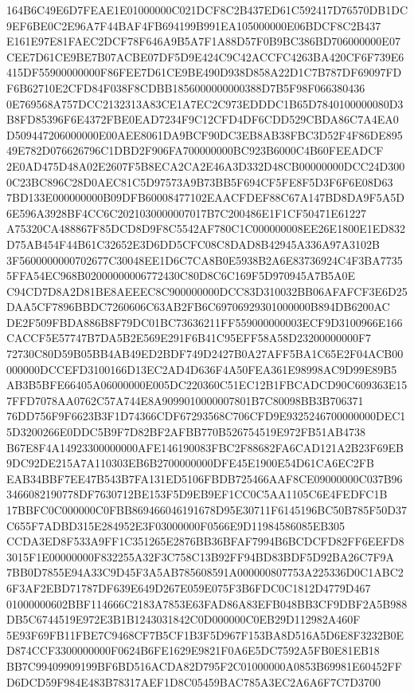 \documentclass[UTF8,fontset=fandol,zihao=-4,a4paper]{ctexart}
\begin{document}
{{164B6C49E6D7FEAE1E01000000C021DCF8C2B437ED61C592417D76570DB1DC9EF6BE0C2E96A7F44BAF4FB694199B991EA105000000E06BDCF8C2B437
E161E97E81FAEC2DCF78F646A9B5A7F1A88D57F0B9BC386BD706000000E07CEE7D61CE9BE7B07ACBE07DF5D9E424C9C42ACCFC4263BA420CF6F739E6
415DF55900000000F86FEE7D61CE9BE490D938D858A22D1C7B787DF69097FDF6B62710E2CFD84F038F8CDBB1856000000000388D7B5F98F066380436
0E769568A757DCC2132313A83CE1A7EC2C973EDDDC1B65D7840100000080D3B8FD85396F6E4372FBE0EAD7234F9C12CFD4DF6CDD529CBDA86C7A4EA0
D509447206000000E00AEE8061DA9BCF90DC3EB8AB38FBC3D52F4F86DE89549E782D076626796C1DBD2F906FA700000000BC923B6000C4B60FEEADCF
2E0AD475D48A02E2607F5B8ECA2CA2E46A3D332D48CB00000000DCC24D3000C23BC896C28D0AEC81C5D97573A9B73BB5F694CF5FE8F5D3F6F6E08D63
7BD133E000000000B09DFB60008477102EAACFDEF88C67A147BD8DA9F5A5D6E596A3928BF4CC6C2021030000007017B7C200486E1F1CF50471E61227
A75320CA488867F85DCD8D9F8C5542AF780C1C000000008EE26E1800E1ED832D75AB454F44B61C32652E3D6DD5CFC08C8DAD8B42945A336A97A3102B
3F5600000000702677C30048EE1D6C7CA8B0E5938B2A6E83736924C4F3BA77355FFA54EC968B02000000006772430C80D8C6C169F5D970945A7B5A0E
C94CD7D8A2D81BE8AEEEC8C900000000DCC83D310032BB06AFAFCF3E6D25DAA5CF7896BBDC7260606C63AB2FB6C69706929301000000B894DB6200AC
DE2F509FBDA886B8F79DC01BC73636211FF559000000003ECF9D3100966E166CACCF5E57747B7DA5B2E569E291F6B41C95EFF58A58D23200000000F7
72730C80D59B05BB4AB49ED2BDF749D2427B0A27AFF5BA1C65E2F04ACB00000000DCCEFD3100166D13EC2AD4D636F4A50FEA361E98998AC9D99E89B5
AB3B5BFE66405A06000000E005DC220360C51EC12B1FBCADCD90C609363E157FFD7078AA0762C57A744E8A9099010000007801B7C80098BB3B706371
76DD756F9F6623B3F1D74366CDF67293568C706CFD9E9325246700000000DEC15D3200266E0DDC5B9F7D82BF2AFBB770B526754519E972FB51AB4738
B67E8F4A14923300000000AFE146190083FBC2F88682FA6CAD121A2B23F69EB9DC92DE215A7A110303EB6B2700000000DFE45E1900E54D61CA6EC2FB
EAB34BBF7EE47B543B7FA131ED5106FBDB725466AAF8CE09000000C037B963466082190778DF7630712BE153F5D9EB9EF1CC0C5AA1105C6E4FEDFC1B
17BBFC0C000000C0FBB869466046191678D95E30711F6145196BC50B785F50D37C655F7ADBD315E284952E3F03000000F0566E9D11984586085EB305
CCDA3ED8F533A9FF1C351265E2876BB36BFAF7994B6BCDCFD82FF6EEFD83015F1E00000000F832255A32F3C758C13B92FF94BD83BDF5D92BA26C7F9A
7BB0D7855E94A33C9D45F3A5AB785608591A000000807753A225336D0C1ABC26F3AF2EBD71787DF639E649D267E059E075F3B6FDC0C1812D4779D467
01000000602BBF114666C2183A7853E63FAD86A83EFB048BB3CF9DBF2A5B988DB5C6744519E972E3B1B1243031842C0D000000C0EB29D112982A460F
5E93F69FB11FBE7C9468CF7B5CF1B3F5D967F153BA8D516A5D6E8F3232B0ED874CCF3300000000F0624B6FE1629E9821F0A6E5DC7592A5FB0E81EB18
BB7C99409909199BF6BD516ACDA82D795F2C01000000A0853B69981E60452FFD6DCD59F984E483B78317AEF1D8C05459BAC785A3EC2A6A6F7C7D3700
}}
\end{document}
